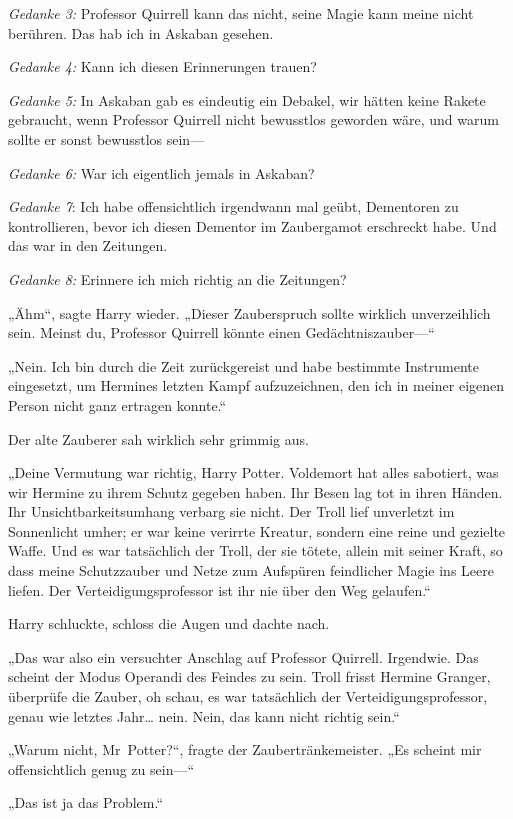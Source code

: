 {\emph{Gedanke 3:} Professor Quirrell kann das nicht, seine Magie kann meine nicht berühren. Das hab ich in Askaban gesehen.

\emph{Gedanke 4:} Kann ich diesen Erinnerungen trauen?

\emph{Gedanke 5:} In Askaban gab es eindeutig ein Debakel, wir hätten keine Rakete gebraucht, wenn Professor Quirrell nicht bewusstlos geworden wäre, und warum sollte er sonst bewusstlos sein—

\emph{Gedanke 6:} War ich eigentlich jemals in Askaban?

\emph{Gedanke 7}: Ich habe offensichtlich irgendwann mal geübt, Dementoren zu kontrollieren, bevor ich diesen Dementor im Zaubergamot erschreckt habe. Und das war in den Zeitungen.

\emph{Gedanke 8:} Erinnere ich mich richtig an die Zeitungen?

„Ähm“, sagte Harry wieder. „Dieser Zauberspruch sollte wirklich unverzeihlich sein. Meinst du, Professor Quirrell könnte einen Gedächtniszauber—“

„Nein. Ich bin durch die Zeit zurückgereist und habe bestimmte Instrumente eingesetzt, um Hermines letzten Kampf aufzuzeichnen, den ich in meiner eigenen Person nicht ganz ertragen konnte.“

Der alte Zauberer sah wirklich sehr grimmig aus.

„Deine Vermutung war richtig, Harry Potter. Voldemort hat alles sabotiert, was wir Hermine zu ihrem Schutz gegeben haben. Ihr Besen lag tot in ihren Händen. Ihr Unsichtbarkeitsumhang verbarg sie nicht. Der Troll lief unverletzt im Sonnenlicht umher; er war keine verirrte Kreatur, sondern eine reine und gezielte Waffe. Und es war tatsächlich der Troll, der sie tötete, allein mit seiner Kraft, so dass meine Schutzzauber und Netze zum Aufspüren feindlicher Magie ins Leere liefen. Der Verteidigungsprofessor ist ihr nie über den Weg gelaufen.“

Harry schluckte, schloss die Augen und dachte nach.

„Das war also ein versuchter Anschlag auf Professor Quirrell. Irgendwie. Das scheint der Modus Operandi des Feindes zu sein. Troll frisst Hermine Granger, überprüfe die Zauber, oh schau, es war tatsächlich der Verteidigungsprofessor, genau wie letztes Jahr… nein. Nein, das kann nicht richtig sein.“

„Warum nicht, Mr~Potter?“, fragte der Zaubertränkemeister. „Es scheint mir offensichtlich genug zu sein—“

„Das ist ja das Problem.“

}
